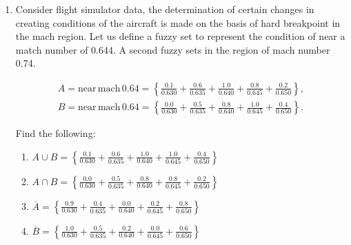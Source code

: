 \documentclass{article}
\begin{document}
\begin{enumerate}
\begin{enumerate}
        \end{enumerate}

  \item Consider flight simulator data, the determination of certain changes in creating conditions of the aircraft is made on the basis of hard breakpoint in the mach region. Let us define a fuzzy set to represent the condition of near a match number of 0.644. A second fuzzy sets in the region of mach number 0.74.

        \begin{gather*}
          A = \mathrm{near \, mach \,} 0.64
          = \left\{
          \frac{0.1}{0.630} +
          \frac{0.6}{0.635} +
          \frac{1.0}{0.640} +
          \frac{0.8}{0.645} +
          \frac{0.2}{0.650}
          \right\}, \\[12pt]
          B = \mathrm{near \, mach \, 0.64} = \left\{
          \frac{0.0}{0.630} +
          \frac{0.5}{0.635} +
          \frac{0.8}{0.640} +
          \frac{1.0}{0.645} +
          \frac{0.4}{0.650}
          \right\}.
        \end{gather*}

        Find the following:

        \begin{enumerate}
          \item $A \cup B = \boldsymbol{\left\{
                    \frac{0.1}{0.630} +
                    \frac{0.6}{0.635} +
                    \frac{1.0}{0.640} +
                    \frac{1.0}{0.645} +
                    \frac{0.4}{0.650}
                    \right\}}$
                \vspace{8pt}

          \item $A \cap B = \boldsymbol{\left\{
                    \frac{0.0}{0.630} +
                    \frac{0.5}{0.635} +
                    \frac{0.8}{0.640} +
                    \frac{0.8}{0.645} +
                    \frac{0.2}{0.650}
                    \right\}}$
                \vspace{8pt}

          \item $\overline{A} = \boldsymbol{\left\{
                    \frac{0.9}{0.630} +
                    \frac{0.4}{0.635} +
                    \frac{0.0}{0.640} +
                    \frac{0.2}{0.645} +
                    \frac{0.8}{0.650}
                    \right\}}$
                \vspace{8pt}

          \item $\overline{B} = \boldsymbol{\left\{
                    \frac{1.0}{0.630} +
                    \frac{0.5}{0.635} +
                    \frac{0.2}{0.640} +
                    \frac{0.0}{0.645} +
                    \frac{0.6}{0.650}
                    \right\}}$
                \vspace{8pt}


\end{enumerate}
\end{enumerate}
\end{document}
